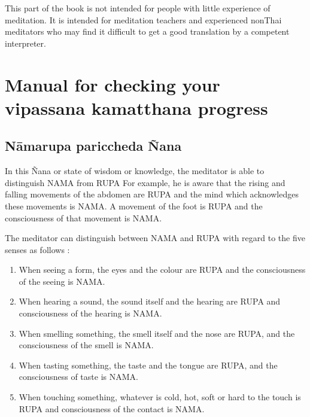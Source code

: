 \documentclass[a5paper,10pt,english]{book}
\begin{document}
\sphinxAtStartPar
This part of the book is not intended for people with little experience of meditation. It is intended for meditation teachers and experienced non\sphinxhyphen{}Thai meditators who may find it difficult to get a good translation by a competent interpreter.

\begin{DUlineblock}{0em}
\item[] 
\item[] 
\end{DUlineblock}

\sphinxstepscope


\chapter{Manual for checking your vipassana kamatthana progress}
\label{\detokenize{progress:manual-for-checking-your-vipassana-kamatthana-progress}}\label{\detokenize{progress::doc}}

\section{Nāmarupa pariccheda Ñana}
\label{\detokenize{progress:namarupa-pariccheda-nana}}
\sphinxAtStartPar
In this Ñana or state of wisdom or knowledge, the meditator is able to distinguish NAMA from RUPA For example, he is aware that the rising and falling movements of the abdomen are RUPA and the mind which acknowledges these movements is NAMA. A movement of the foot is RUPA and the consciousness of that movement is NAMA.

\sphinxAtStartPar
The meditator can distinguish between NAMA and RUPA with regard to the five senses as follows  :\sphinxhyphen{}
\begin{enumerate}
%
\item {} 
\sphinxAtStartPar
When seeing a form, the eyes and the colour are RUPA and the consciousness of the seeing is NAMA.

\item {} 
\sphinxAtStartPar
When hearing a sound, the sound itself and the hearing are RUPA and consciousness of the hearing is NAMA.

\item {} 
\sphinxAtStartPar
When smelling something, the smell itself and the nose are RUPA, and the consciousness of the smell is NAMA.

\item {} 
\sphinxAtStartPar
When tasting something, the taste and the tongue are RUPA, and the consciousness of taste is NAMA.

\item {} 
\sphinxAtStartPar
When touching something, whatever is cold, hot, soft or hard to the touch is RUPA and consciousness of the contact is NAMA.

\end{enumerate}
\end{document}
